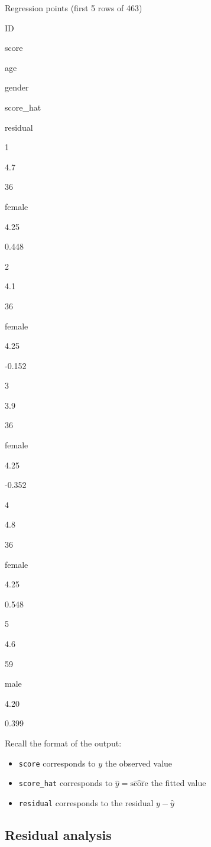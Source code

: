 \documentclass[12pt,]{krantz}
\providecommand{\tightlist}{%
  \setlength{\itemsep}{0pt}\setlength{\parskip}{0pt}}
\begin{document}
\label{tab:model4-points-table}Regression points (first 5 rows of 463)

ID

score

age

gender

score\_hat

residual

1

4.7

36

female

4.25

0.448

2

4.1

36

female

4.25

-0.152

3

3.9

36

female

4.25

-0.352

4

4.8

36

female

4.25

0.548

5

4.6

59

male

4.20

0.399

Recall the format of the output:

\begin{itemize}
\tightlist
\item
  \texttt{score} corresponds to \(y\) the observed value
\item
  \texttt{score\_hat} corresponds to
  \(\widehat{y} = \widehat{\mbox{score}}\) the fitted value
\item
  \texttt{residual} corresponds to the residual \(y - \widehat{y}\)
\end{itemize}

\subsection{Residual analysis}\label{model4residuals}
\end{document}
